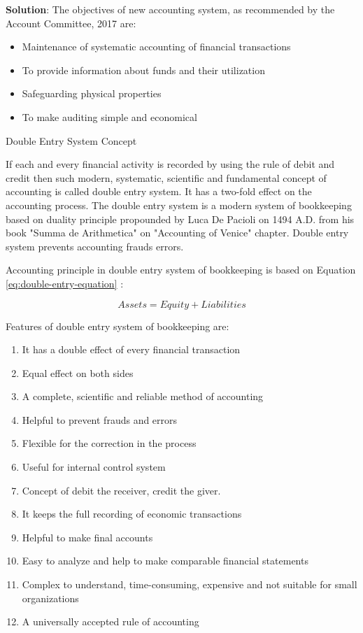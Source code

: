 \documentclass[
]{book}
\newenvironment{solution}{ {\bfseries Solution}:}{}
\begin{document}
\begin{questions}
\begin{solution}
The objectives of new accounting system, as recommended by the Account Committee, 2017 are:

\begin{itemize}
\item Maintenance of systematic accounting of financial transactions
\item To provide information about funds and their utilization
\item Safeguarding physical properties
\item To make auditing simple and economical
\end{itemize}

Double Entry System Concept

If each and every financial activity is recorded by using the rule of debit and credit then such modern, systematic, scientific and fundamental concept of accounting is called double entry system. It has a two-fold effect on the accounting process. The double entry system is a modern system of bookkeeping based on duality principle propounded by Luca De Pacioli on 1494 A.D. from his book "Summa de Arithmetica" on "Accounting of Venice" chapter. Double entry system prevents accounting frauds errors.

Accounting principle in double entry system of bookkeeping is based on Equation \ref{eq:double-entry-equation} :

\begin{equation}
Assets = Equity + Liabilities
\label{eq:double-entry-equation}
\end{equation}

Features of double entry system of bookkeeping are:

\begin{enumerate}
\item It has a double effect of every financial transaction
\item Equal effect on both sides
\item A complete, scientific and reliable method of accounting
\item Helpful to prevent frauds and errors
\item Flexible for the correction in the process
\item Useful for internal control system
\item Concept of debit the receiver, credit the giver.
\item It keeps the full recording of economic transactions
\item Helpful to make final accounts
\item Easy to analyze and help to make comparable financial statements
\item Complex to understand, time-consuming, expensive and not suitable for small organizations
\item A universally accepted rule of accounting
\end{enumerate}
\end{solution}


\end{questions}
\end{document}

